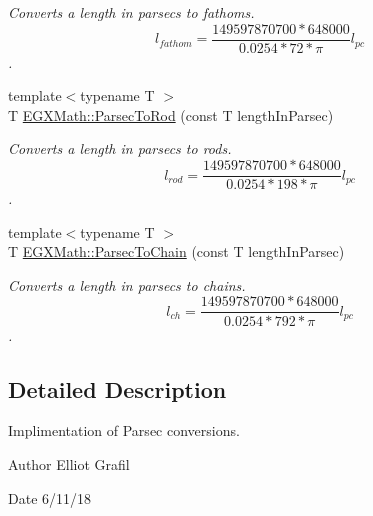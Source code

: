 \begin{DoxyCompactItemize}
\begin{DoxyCompactList}\small\item\em Converts a length in parsecs to fathoms. \[ l_{fathom}= \frac{149597870700 * 648000}{0.0254 * 72 * \pi} l_{pc} \]. \end{DoxyCompactList}\item 
{\footnotesize template$<$typename T $>$ }\\T \mbox{\hyperlink{group___e_g_x_math-_conversions-_length_conversions-_astronomical-_parsec-_surveyors_gae1b8ed339937e1c769e4617dbe1e70e1}{E\+G\+X\+Math\+::\+Parsec\+To\+Rod}} (const T length\+In\+Parsec)
\begin{DoxyCompactList}\small\item\em Converts a length in parsecs to rods. \[ l_{rod}= \frac{149597870700 * 648000}{0.0254 * 198 * \pi} l_{pc} \]. \end{DoxyCompactList}\item 
{\footnotesize template$<$typename T $>$ }\\T \mbox{\hyperlink{group___e_g_x_math-_conversions-_length_conversions-_astronomical-_parsec-_surveyors_gafe4318e1971a50fd899558ca0e9cf7c6}{E\+G\+X\+Math\+::\+Parsec\+To\+Chain}} (const T length\+In\+Parsec)
\begin{DoxyCompactList}\small\item\em Converts a length in parsecs to chains. \[ l_{ch}= \frac{149597870700 * 648000}{0.0254 * 792 * \pi} l_{pc} \]. \end{DoxyCompactList}\end{DoxyCompactItemize}


\subsection{Detailed Description}
Implimentation of Parsec conversions. 

\begin{DoxyAuthor}{Author}
Elliot Grafil 
\end{DoxyAuthor}
\begin{DoxyDate}{Date}
6/11/18 
\end{DoxyDate}
